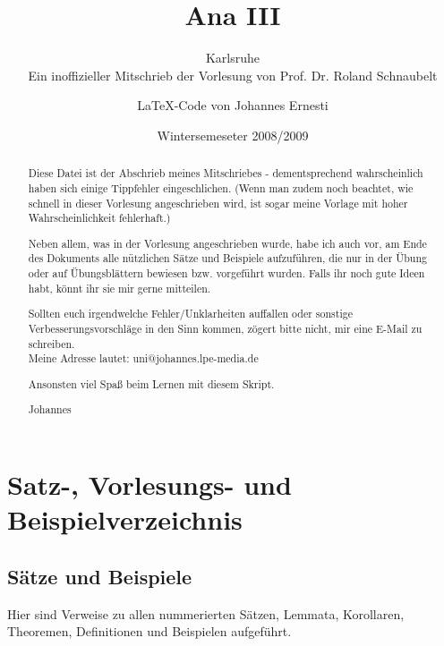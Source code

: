 \documentclass[a4paper]{scrreprt}
\title{Ana III}
\subtitle{Karlsruhe\\Ein inoffizieller Mitschrieb der Vorlesung von Prof. Dr. Roland Schnaubelt}
\author{\LaTeX-Code von Johannes Ernesti}
\date{Wintersemeseter 2008/2009}
\newcommand{\jhyperref}[2]{\hyperref[j_#1]{#2}}
\newcommand{\jlink}[1]{\jhyperref{#1}{#1}}
\newcommand{\jspace}{\vspace{8pt}}
\theoremstyle{plain}
\theoremstyle{definition}
\begin{document}
\maketitle

\begin{abstract}
    Diese Datei ist der Abschrieb meines Mitschriebes - dementsprechend wahrscheinlich haben sich einige Tippfehler eingeschlichen. (Wenn man zudem noch beachtet, wie schnell in dieser Vorlesung angeschrieben wird, ist sogar meine Vorlage mit hoher Wahrscheinlichkeit fehlerhaft.)
    
    \jspace
    
    Neben allem, was in der Vorlesung angeschrieben wurde, habe ich auch vor, am Ende des Dokuments alle nützlichen Sätze und Beispiele aufzuführen, die nur in der Übung oder auf Übungsblättern bewiesen bzw. vorgeführt wurden. Falls ihr noch gute Ideen habt, könnt ihr sie mir gerne mitteilen.
    
    \jspace
    
    Sollten euch irgendwelche Fehler/Unklarheiten auffallen oder sonstige Verbesserungsvorschläge in den Sinn kommen, zögert bitte nicht, mir eine E-Mail zu schreiben.\\
    Meine Adresse lautet: uni@johannes.lpe-media.de
    
    \jspace
    
    Ansonsten viel Spaß beim Lernen mit diesem Skript.
    
    \jspace
    
    Johannes
\end{abstract}

\clearpage{}
\tableofcontents

\newpage

\section{Satz-, Vorlesungs- und Beispielverzeichnis}

\newcommand{\jtablelink}[1]{\jlink{#1} & \jhyperref{#1}{\pageref{j_#1}}}

\subsection{Sätze und Beispiele}

Hier sind Verweise zu allen nummerierten Sätzen, Lemmata, Korollaren, Theoremen, Definitionen und Beispielen aufgeführt.
\end{document}
